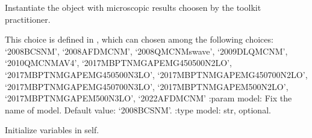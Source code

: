 \documentclass[letterpaper,10pt,english]{sphinxmanual}
\begin{document}

\begin{fulllineitems}
\label{\detokenize{source/api/setup_eos_micro_gap:nucleardatapy.eos.setup_micro_gap.setupMicroGap}}
\pysigstartsignatures
{}
\pysigstopsignatures
\sphinxAtStartPar
Instantiate the object with microscopic results choosen     by the toolkit practitioner.

\sphinxAtStartPar
This choice is defined in , which can chosen among     the following choices:     ‘2008\sphinxhyphen{}BCS\sphinxhyphen{}NM’, ‘2008\sphinxhyphen{}AFDMC\sphinxhyphen{}NM’,     ‘2008\sphinxhyphen{}QMC\sphinxhyphen{}NM\sphinxhyphen{}swave’, ‘2009\sphinxhyphen{}DLQMC\sphinxhyphen{}NM’, ‘2010\sphinxhyphen{}QMC\sphinxhyphen{}NM\sphinxhyphen{}AV4’, ‘2017\sphinxhyphen{}MBPT\sphinxhyphen{}NM\sphinxhyphen{}GAP\sphinxhyphen{}EMG\sphinxhyphen{}450\sphinxhyphen{}500\sphinxhyphen{}N2LO’,     ‘2017\sphinxhyphen{}MBPT\sphinxhyphen{}NM\sphinxhyphen{}GAP\sphinxhyphen{}EMG\sphinxhyphen{}450\sphinxhyphen{}500\sphinxhyphen{}N3LO’, ‘2017\sphinxhyphen{}MBPT\sphinxhyphen{}NM\sphinxhyphen{}GAP\sphinxhyphen{}EMG\sphinxhyphen{}450\sphinxhyphen{}700\sphinxhyphen{}N2LO’,     ‘2017\sphinxhyphen{}MBPT\sphinxhyphen{}NM\sphinxhyphen{}GAP\sphinxhyphen{}EMG\sphinxhyphen{}450\sphinxhyphen{}700\sphinxhyphen{}N3LO’, ‘2017\sphinxhyphen{}MBPT\sphinxhyphen{}NM\sphinxhyphen{}GAP\sphinxhyphen{}EM\sphinxhyphen{}500\sphinxhyphen{}N2LO’, ‘2017\sphinxhyphen{}MBPT\sphinxhyphen{}NM\sphinxhyphen{}GAP\sphinxhyphen{}EM\sphinxhyphen{}500\sphinxhyphen{}N3LO’,     ‘2022\sphinxhyphen{}AFDMC\sphinxhyphen{}NM’
:param model: Fix the name of model. Default value: ‘2008\sphinxhyphen{}BCS\sphinxhyphen{}NM’.
:type model: str, optional.

\sphinxAtStartPar
{}

\begin{fulllineitems}
\label{\detokenize{source/api/setup_eos_micro_gap:nucleardatapy.eos.setup_micro_gap.setupMicroGap.init_self}}
\pysigstartsignatures
{}
\pysigstopsignatures
\sphinxAtStartPar
Initialize variables in self.


\end{fulllineitems}
\end{fulllineitems}
\end{document}
